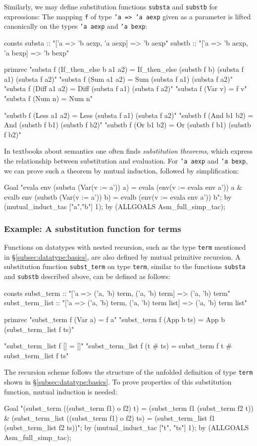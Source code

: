 Similarly, we may define substitution functions \texttt{substa}
and \texttt{substb} for expressions: The mapping \texttt{f} of type
\texttt{'a => 'a aexp} given as a parameter is lifted canonically
on the types \texttt{'a aexp} and \texttt{'a bexp}:
\begin{ttbox}
consts
  substa :: "['a => 'b aexp, 'a aexp] => 'b aexp"
  substb :: "['a => 'b aexp, 'a bexp] => 'b bexp"

primrec
  "substa f (If_then_else b a1 a2) =
     If_then_else (substb f b) (substa f a1) (substa f a2)"
  "substa f (Sum a1 a2) = Sum (substa f a1) (substa f a2)"
  "substa f (Diff a1 a2) = Diff (substa f a1) (substa f a2)"
  "substa f (Var v) = f v"
  "substa f (Num n) = Num n"

  "substb f (Less a1 a2) = Less (substa f a1) (substa f a2)"
  "substb f (And b1 b2) = And (substb f b1) (substb f b2)"
  "substb f (Or b1 b2) = Or (substb f b1) (substb f b2)"
\end{ttbox}
In textbooks about semantics one often finds {\em substitution theorems},
which express the relationship between substitution and evaluation. For
\texttt{'a aexp} and \texttt{'a bexp}, we can prove such a theorem by mutual
induction, followed by simplification:
\begin{ttbox}
Goal
  "evala env (substa (Var(v := a')) a) =
     evala (env(v := evala env a')) a &
   evalb env (substb (Var(v := a')) b) =
     evalb (env(v := evala env a')) b";
by (mutual_induct_tac ["a","b"] 1);
by (ALLGOALS Asm_full_simp_tac);
\end{ttbox}

\subsubsection{Example: A substitution function for terms}
Functions on datatypes with nested recursion, such as the type
\texttt{term} mentioned in \S\ref{subsec:datatype:basics}, are
also defined by mutual primitive recursion. A substitution
function \texttt{subst_term} on type \texttt{term}, similar to the functions
\texttt{substa} and \texttt{substb} described above, can
be defined as follows:
\begin{ttbox}
consts
  subst_term :: "['a => ('a, 'b) term, ('a, 'b) term] => ('a, 'b) term"
  subst_term_list ::
    "['a => ('a, 'b) term, ('a, 'b) term list] => ('a, 'b) term list"

primrec
  "subst_term f (Var a) = f a"
  "subst_term f (App b ts) = App b (subst_term_list f ts)"

  "subst_term_list f [] = []"
  "subst_term_list f (t # ts) =
     subst_term f t # subst_term_list f ts"
\end{ttbox}
The recursion scheme follows the structure of the unfolded definition of type
\texttt{term} shown in \S\ref{subsec:datatype:basics}. To prove properties of
this substitution function, mutual induction is needed:
\begin{ttbox}
Goal
  "(subst_term ((subst_term f1) o f2) t) =
     (subst_term f1 (subst_term f2 t)) &
   (subst_term_list ((subst_term f1) o f2) ts) =
     (subst_term_list f1 (subst_term_list f2 ts))";
by (mutual_induct_tac ["t", "ts"] 1);
by (ALLGOALS Asm_full_simp_tac);
\end{ttbox}

